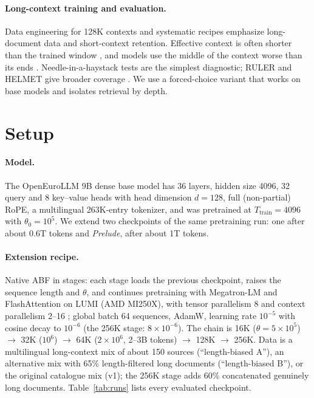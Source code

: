 \documentclass[11pt]{article}
\begin{document}
\paragraph{Long-context training and evaluation.} Data engineering for 128K contexts \citep{fu2024data} and systematic recipes \citep{gao2025prolong} emphasize long-document data and short-context retention. Effective context is often shorter than the trained window \citep{an2025string}, and models use the middle of the context worse than its ends \citep{liu2024lostmiddle}. Needle-in-a-haystack tests \citep{kamradt2023niah} are the simplest diagnostic; RULER and HELMET give broader coverage \citep{hsieh2024ruler,yen2025helmet}. We use a forced-choice variant that works on base models and isolates retrieval by depth.

\section{Setup}
\label{sec:setup}

\paragraph{Model.} The OpenEuroLLM 9B dense base model \citep{openeurollm2025} has 36 layers, hidden size 4096, 32 query and 8 key--value heads with head dimension $d=128$, full (non-partial) RoPE, a multilingual 263K-entry tokenizer, and was pretrained at $T_{\mathrm{train}}=4096$ with $\theta_0=10^5$. We extend two checkpoints of the same pretraining run: one after about 0.6T tokens and \emph{Prelude}, after about 1T tokens.

\paragraph{Extension recipe.} Native ABF in stages: each stage loads the previous checkpoint, raises the sequence length and $\theta$, and continues pretraining with Megatron-LM \citep{shoeybi2019megatron} and FlashAttention \citep{dao2024flashattention2} on LUMI (AMD MI250X), with tensor parallelism 8 and context parallelism 2--16 \citep{liu2024ringattention}; global batch 64 sequences, AdamW, learning rate $10^{-5}$ with cosine decay to $10^{-6}$ (the 256K stage: $8\times10^{-6}$). The chain is 16K ($\theta{=}5\times10^5$) $\to$ 32K ($10^6$) $\to$ 64K ($2\times10^6$, 2--3B tokens) $\to$ 128K $\to$ 256K. Data is a multilingual long-context mix of about 150 sources (``length-biased A''), an alternative mix with 65\% length-filtered long documents (``length-biased B''), or the original catalogue mix (v1); the 256K stage adds 60\% concatenated genuinely long documents. Table~\ref{tab:runs} lists every evaluated checkpoint.
\end{document}
